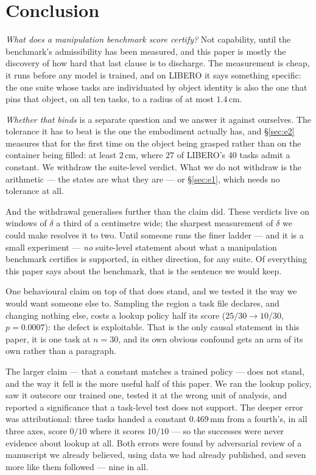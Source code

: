 \documentclass[10pt,twocolumn]{article}
\begin{document}
\section{Conclusion}

\emph{What does a manipulation benchmark score certify?} Not capability,
until the benchmark's admissibility has been measured, and this paper is
mostly the discovery of how hard that last clause is to discharge. The measurement is cheap, it runs
before any model is trained, and on LIBERO it says something specific: the one
suite whose tasks are individuated by object identity is also the one that pins
that object, on all ten tasks, to a radius of at most $1.4$\,cm.

\emph{Whether that binds} is a separate question and we answer it against
ourselves. The tolerance it has to beat is the one the embodiment actually has,
and \S\ref{sec:e2} measures that for the first time on the object being
grasped rather than on the container being filled: at least $2$\,cm, where $27$
of LIBERO's $40$ tasks admit a constant. We withdraw the suite-level verdict.
What we do not withdraw is the arithmetic --- the states are what they are ---
or \S\ref{sec:e1}, which needs no tolerance at all.

And the withdrawal generalises further than the claim did. These verdicts live
on windows of $\delta$ a third of a centimetre wide; the sharpest measurement
of $\delta$ we could make resolves it to two. Until someone runs the finer
ladder --- and it is a small experiment --- \emph{no} suite-level statement
about what a manipulation benchmark certifies is supported, in either
direction, for any suite. Of everything this paper says about the benchmark,
that is the sentence we would keep.

One behavioural claim on top of that does stand, and we tested it the way we
would want someone else to. Sampling the region a task file declares, and
changing nothing else, costs a lookup policy half its score
($25/30 \to 10/30$, $p = 0.0007$): the defect is exploitable.
That is the only causal statement in this paper, it is one task at $n{=}30$,
and its own obvious confound gets an arm of its own rather than a paragraph.

The larger claim --- that a constant matches a trained policy --- does not
stand, and the way it fell is the more useful half of this paper. We ran the lookup policy, saw it outscore
our trained one, tested it at the wrong unit of analysis, and reported a
significance that a task-level test does not support. The deeper error was
attributional: three tasks handed a constant $0.469$\,mm from a fourth's, in
all three axes, score $0/10$ where it scores $10/10$ --- so the successes were
never evidence about lookup at all. Both errors were found by adversarial
review of a manuscript we already believed, using data we had already
published, and seven more like them followed --- nine in all.
\end{document}
